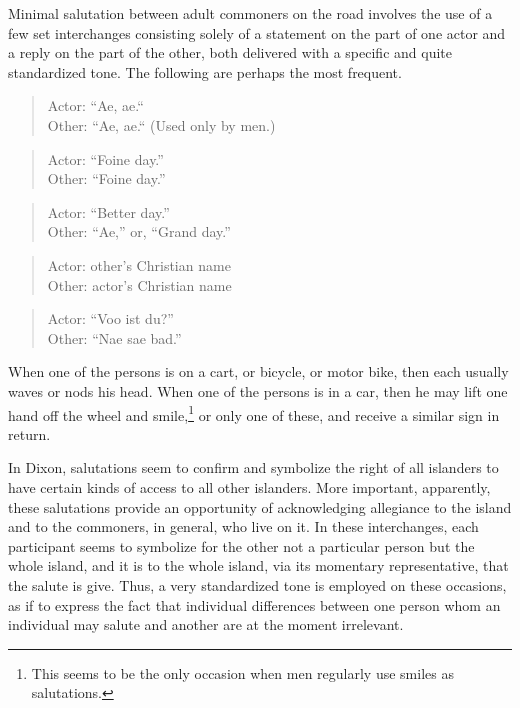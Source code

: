 \documentclass[openany,nobib]{tufte-book}
\begin{document}
Minimal salutation between adult commoners on the road involves the use
of a few set interchanges consisting solely of a statement on the part
of one actor and a reply on the part of the other, both delivered with a
specific and quite standardized tone. The following are perhaps the most
frequent.

\begin{quote}
Actor: ``Ae, ae.`` \\
Other: ``Ae, ae.`` (Used only by men.)
\end{quote}

\begin{quote}
Actor: ``Foine day.'' \\
Other: ``Foine day.''
\end{quote}

\begin{quote}
Actor: ``Better day.'' \\
Other: ``Ae,'' or, ``Grand day.''
\end{quote}

\begin{quote}
Actor: other's Christian name \\
Other: actor's Christian name
\end{quote}

\begin{quote}
Actor: ``Voo ist du?'' \\
Other: ``Nae sae bad.''
\end{quote}

\noindent When one of the persons is on a cart, or bicycle, or motor bike, then
each usually waves or nods his head. When one of the persons is in a
car, then he may lift one hand off the wheel and smile,\footnote{This
  seems to be the only occasion when men regularly use smiles as
  salutations.} or only one of these, and receive a similar sign in
return.

In Dixon, salutations seem to confirm and symbolize the right of all
islanders to have certain kinds of access to all other islanders. More
important, apparently, these salutations provide an opportunity of
acknowledging allegiance to the island and to the commoners, in general,
who live on it. In these interchanges, each participant seems to
symbolize for the other not a particular person but the whole island,
and it is to the whole island, via its momentary representative, that
the salute is give. Thus, a very standardized tone is employed on these
occasions, as if to express the fact that individual differences between
one person whom an individual may salute and another are at the moment
irrelevant.
\end{document}
